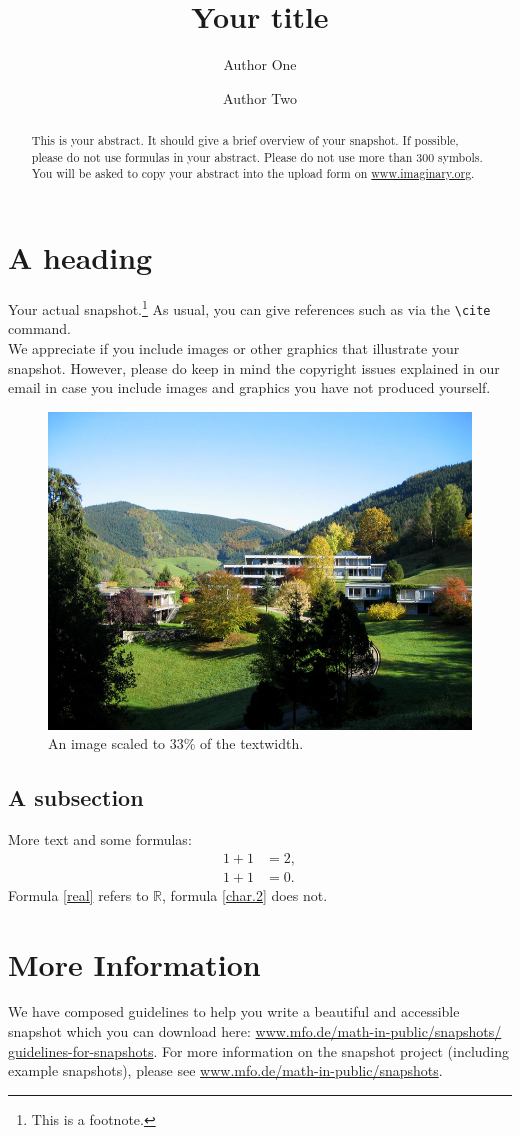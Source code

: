 \documentclass{snapshotmfo}
\author{Author One \and Author Two}
\title{Your title}
\begin{document}
\begin{abstract}
This is your abstract. It should give a brief overview of your snapshot. If possible, please do not use formulas in your abstract. Please do not use more than 300 symbols. You will be asked to copy your abstract into the upload form on \href{http://www.imaginary.org}{www.imaginary.org}. 
\end{abstract}

\section{A heading}
Your actual snapshot.\footnote{This is a footnote.} As usual, you can give references such as \cite{snapshot, knuth1986texbook, wikiMath} via the \verb+\cite+ command.\\

We appreciate if you include images or other graphics that illustrate your snapshot. However, please do keep in mind the copyright issues explained in our email in case you include images and graphics you have not produced yourself.

\begin{figure}[h]
        \centering 
        \includegraphics[width= 0.33 \textwidth]{sample-image.jpg}
        \caption{An image scaled to 33\% of the textwidth.}
\label{fig:sample-image}
\end{figure}

\subsection{A subsection}
More text and some formulas:
\begin{align}\label{real}
1+1&=2,\\\label{char.2}
1+1&=0.
\end{align}
Formula \eqref{real} refers to $\mathbb{R}$, formula \eqref{char.2} does not.

\section{More Information}
We have composed guidelines to help you write a beautiful and accessible snapshot which you can download here: \href{http://www.mfo.de/math-in-public/snapshots/guidelines-for-snapshots}{www.mfo.de/math-in-public/snapshots/ guidelines-for-snapshots}. For more information on the snapshot project (including example snapshots), please see \href{http://www.mfo.de/math-in-public/snapshots}{www.mfo.de/math-in-public/snapshots}.
\end{document}
